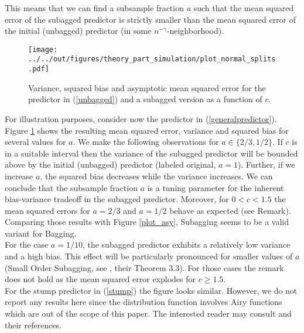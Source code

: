 This means that we can find a subsample fraction $a$ such that the mean squared error of the subagged predictor is strictly smaller than the mean squared error of the initial (unbagged) predictor (in some $n^{-\gamma}$-neighborhood).
\begin{figure}[b]
\centering
\texttt{[image: ../../out/figures/theory\_part\_simulation/plot\_normal\_splits.pdf]}
\caption[Variance, squared bias and asymptotic mean squared error for the predictor in (\ref{unbagged}) and a subagged version as a function of $c$.]{Variance, squared bias and asymptotic mean squared error for the predictor in (\ref{unbagged}) and a subagged version as a function of $c$.}\label{plot_normal_splits_together}
\end{figure}
For illustration purposes, consider now the predictor in (\ref{generalpredictor}). Figure \ref{plot_normal_splits_together} shows the resulting mean squared error, variance and squared bias for several values for $a$.
We make the following observations for $a \in \{2/3, 1/2\}$.
If $c$ is in a suitable interval then the variance of the subagged predictor will be bounded above by the initial (unbagged) predictor (labeled original, $a=1$).
Further, if we increase $a$, the squared bias decreases while the variance increases. We can conclude that the subsample fraction $a$ is a tuning parameter for  the inherent bias-variance tradeoff in the subagged predictor.
Moreover, for $0<c<1.5$ the mean squared errors for $a=2/3$ and $a=1/2$ behave as expected (see Remark). Comparing those results with Figure \ref{plot_asy}, Subagging seems to be a valid variant for Bagging.\\
For the case $a=1/10$, the subagged predictor exhibits a relatively low variance and a high bias. This effect will be particularly pronounced for smaller values of $a$ (Small Order Subagging, see \cite{Buhlmann2002}, their Theorem 3.3). For those cases the remark does not hold as the mean squared error explodes for $c \geq 1.5$.\\
For the stump predictor in (\ref{stump}) the figure looks similar.
However, we do not report any results here since the distribution function involves Airy functions which are out of the scope of this paper.
The interested reader may consult \cite{Buhlmann2002} and their references.
